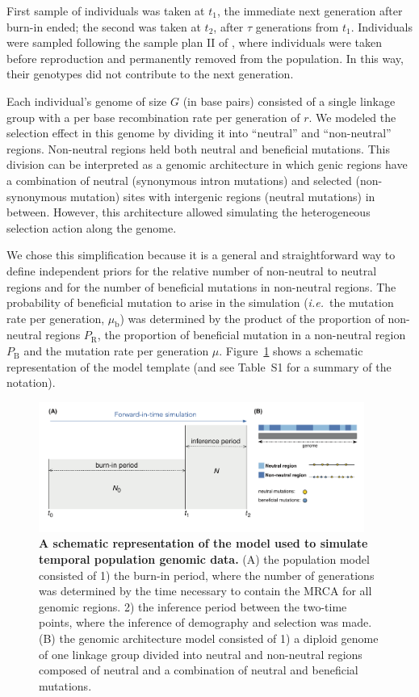 \documentclass[a4paper, 12pt]{article}
\begin{document}
First sample of individuals was taken at $t_1$, the immediate next generation after burn-in ended; the second was taken at $t_2$, after $\tau$ generations from $t_1$. Individuals were sampled following the sample plan II of \citet{Nei:1981vb}, where individuals were taken before reproduction and permanently removed from the population. In this way, their genotypes did not contribute to the next generation.

Each individual's genome of size $G$ (in base pairs) consisted of a single linkage group with a per base recombination rate per generation of $r$. We modeled the selection effect in this genome by dividing it into ``neutral'' and ``non-neutral'' regions. Non-neutral regions held both neutral and beneficial mutations. This division can be interpreted as a genomic architecture in which genic regions have a combination of neutral (synonymous intron mutations) and selected (non-synonymous mutation) sites with intergenic regions (neutral mutations) in between. However, this architecture allowed simulating the heterogeneous selection action along the genome. 

We chose this simplification because it is a general and straightforward way to define independent priors for the relative number of non-neutral to neutral regions and for the number of beneficial mutations in non-neutral regions. The probability of beneficial mutation to arise in the simulation (\textit{i.e.}~the mutation rate per generation, $\mu_\mathrm{b}$) was determined by the product of the proportion of non-neutral regions $P_\mathrm{R}$, the proportion of beneficial mutation in a non-neutral region $P_\mathrm{B}$ and the mutation rate per generation $\mu$. Figure~\ref{fig:model} shows a schematic representation of the model template (and see Table~S1 for a summary of the notation).

\begin{figure}[ht]
 \centering
 \includegraphics[width=0.95\textwidth]{Figures/Figure1_model.pdf}
 \small\caption{\textbf{A schematic representation of the model used to simulate temporal population genomic data.} (A) the population model consisted of 1) the burn-in period, where the number of generations was determined by the time necessary to contain the MRCA for all genomic regions. 2) the inference period between the two-time points, where the inference of demography and selection was made. (B) the genomic architecture model consisted of 1) a diploid genome of one linkage group divided into neutral and non-neutral regions composed of neutral and a combination of neutral and beneficial mutations.}\label{fig:model}
\end{figure}
\end{document}
